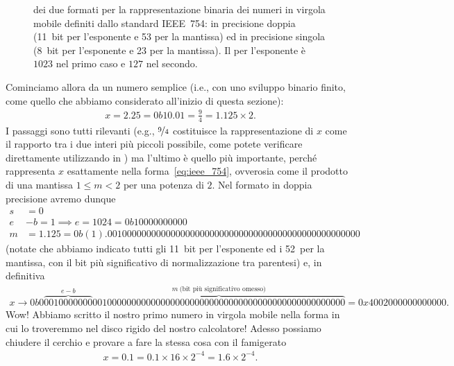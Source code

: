 \begin{figure}[!htbp]
  \center
  \vspace*{-10pt}
  \caption{ dei due formati per la rappresentazione binaria dei
  numeri in virgola mobile definiti dallo standard IEEE~754: in precisione
  doppia (11~bit per l'esponente e 53 per la mantissa) ed in precisione singola
  (8~bit per l'esponente e 23 per la mantissa). Il  per l'esponente
  è $1023$ nel primo caso e $127$ nel secondo.}
  \label{fig:rappresentazione_float}
\end{figure}


Cominciamo allora da un numero semplice (i.e., con uno sviluppo binario finito,
come quello che abbiamo considerato all'inizio di questa sezione):
\begin{align*}
  x = 2.25 = 0b10.01 = \frac{9}{4} = 1.125 \times 2.
\end{align*}
I passaggi sono tutti rilevanti (e.g., $\nicefrac{9}{4}$ costituisce la
rappresentazione di $x$ come il rapporto tra i due interi più piccoli possibile,
come potete verificare direttamente utilizzando  in \python)
ma l'ultimo è quello più importante, perché rappresenta $x$ esattamente
nella forma~\eqref{eq:ieee_754}, ovverosia come il prodotto di una mantissa
$1 \leq m < 2$ per una potenza di $2$.
Nel formato in doppia precisione avremo dunque
\begin{align*}
  s & = 0\\
  e & - b = 1 \implies e = 1024 =  0b10000000000\\
  m & = 1.125 = 0b(1).0010000000000000000000000000000000000000000000000000
\end{align*}
(notate che abbiamo indicato tutti gli 11~bit per l'esponente ed i 52~per la
mantissa, con il bit più significativo di normalizzazione tra parentesi) e,
in definitiva
\begin{align*}
  x \rightarrow 0b0\overbrace{0010000000}^{e-b}
  \overbrace{0010000000000000000000000000000000000000000000000000}^{m~\text{(bit più significativo omesso)}}
  = 0x4002000000000000 .
\end{align*}
Wow! Abbiamo scritto il nostro primo numero in virgola mobile nella forma in
cui lo troveremmo nel disco rigido del nostro calcolatore! Adesso possiamo
chiudere il cerchio e provare a fare la stessa cosa con il famigerato
\begin{align*}
  x = 0.1 = 0.1 \times 16 \times 2^{-4} = 1.6 \times 2^{-4}.
\end{align*}

